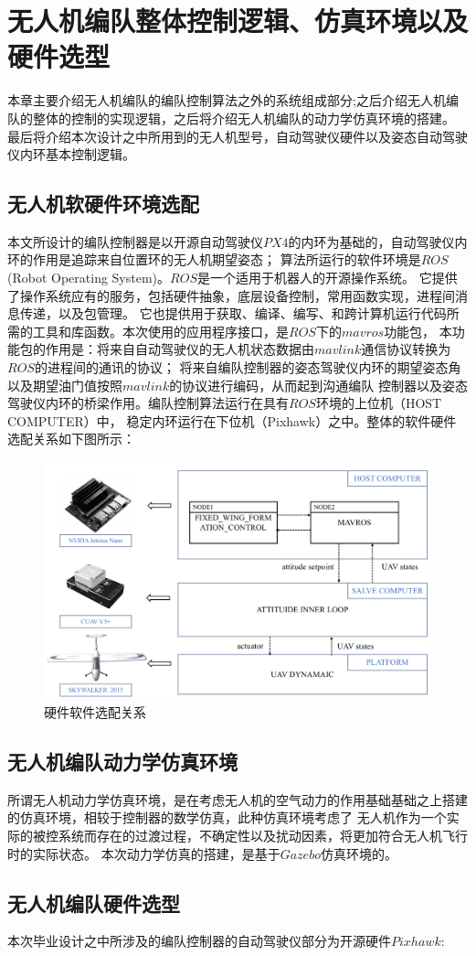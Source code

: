 \chapter{无人机编队整体控制逻辑、仿真环境以及硬件选型}
\label{chap:hardware}
本章主要介绍无人机编队的编队控制算法之外的系统组成部分;之后介绍无人机编队的整体的控制的实现逻辑，之后将介绍无人机编队的动力学仿真环境的搭建。
最后将介绍本次设计之中所用到的无人机型号，自动驾驶仪硬件以及姿态自动驾驶仪内环基本控制逻辑。
\section{无人机软硬件环境选配}
本文所设计的编队控制器是以开源自动驾驶仪$PX4$的内环为基础的，自动驾驶仪内环的作用是追踪来自位置环的无人机期望姿态；
算法所运行的软件环境是$ROS$(Robot Operating System)。$ROS$是一个适用于机器人的开源操作系统。
它提供了操作系统应有的服务，包括硬件抽象，底层设备控制，常用函数实现，进程间消息传递，以及包管理。
它也提供用于获取、编译、编写、和跨计算机运行代码所需的工具和库函数。本次使用的应用程序接口，是$ROS$下的$mavros$功能包，
本功能包的作用是：将来自自动驾驶仪的无人机状态数据由$mavlink$通信协议转换为$ROS$的进程间的通讯的协议；
将来自编队控制器的姿态驾驶仪内环的期望姿态角以及期望油门值按照$mavlink$的协议进行编码，从而起到沟通编队
控制器以及姿态驾驶仪内环的桥梁作用。编队控制算法运行在具有$ROS$环境的上位机（HOST COMPUTER）中，
稳定内环运行在下位机（Pixhawk）之中。整体的软件硬件选配关系如下图所示：
\begin{figure}[H]
    \centering
    \includegraphics[width=1\textwidth]{figures/c4/c4-soft-hard.png}
    \caption{硬件软件选配关系}\label{fig:c4-soft-hard.png}
\end{figure}
\section{无人机编队动力学仿真环境}
所谓无人机动力学仿真环境，是在考虑无人机的空气动力的作用基础基础之上搭建的仿真环境，相较于控制器的数学仿真，此种仿真环境考虑了
无人机作为一个实际的被控系统而存在的过渡过程，不确定性以及扰动因素，将更加符合无人机飞行时的实际状态。
本次动力学仿真的搭建，是基于$Gazebo$仿真环境的。
\section{无人机编队硬件选型}
本次毕业设计之中所涉及的编队控制器的自动驾驶仪部分为开源硬件$Pixhawk$:
